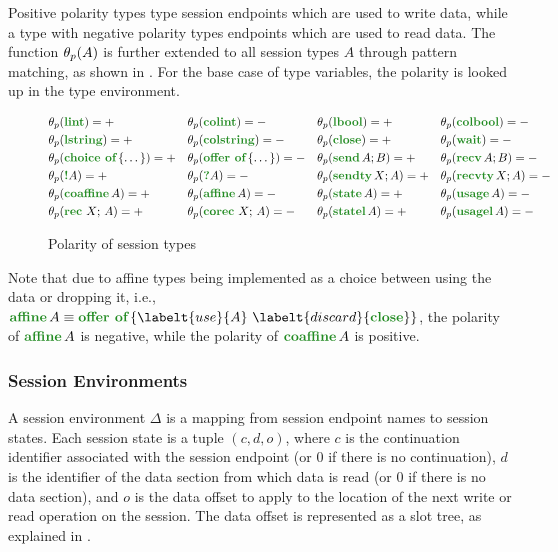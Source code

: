 Positive polarity types type session endpoints which are used to write data, while a type with negative polarity types endpoints which are used to read data. The function $\theta_{p}(A)$ is further extended to all session types $A$ through pattern matching, as shown in . For the base case of type variables, the polarity is looked up in the type environment.

\begin{figure}
    \centering
    \[\begin{aligned}
        &\polarityof{\theta}{\lintt} = + && \polarityof{\theta}{\colintt} = - && \polarityof{\theta}{\lboolt} = + && \polarityof{\theta}{\colboolt} = - \\
        &\polarityof{\theta}{\lstringt} = + && \polarityof{\theta}{\colstringt} = - && \polarityof{\theta}{\closet} = + && \polarityof{\theta}{\waitt} = - \\
        &\polarityof{\theta}{\choicet{\dots}} = + && \polarityof{\theta}{\offert{\dots}} = - && \polarityof{\theta}{\sendt{A}{B}} = + && \polarityof{\theta}{\recvt{A}{B}} = - \\
        &\polarityof{\theta}{\bangt{A}} = + && \polarityof{\theta}{\whynott{A}} = - && \polarityof{\theta}{\sendtyt{X}{A}} = + && \polarityof{\theta}{\recvtyt{X}{A}} = - \\
        &\polarityof{\theta}{\coaffinet{A}} = + && \polarityof{\theta}{\affinet{A}} = - && \polarityof{\theta}{\statet{A}} = + && \polarityof{\theta}{\usaget{A}} = - \\
        &\polarityof{\theta}{\rect{X}{A}} = + && \polarityof{\theta}{\corect{X}{A}} = - && \polarityof{\theta}{\statelt{A}} = + && \polarityof{\theta}{\usagelt{A}} = - \\
    \end{aligned}\]
    \caption{Polarity of session types}
    \label{fig:TypePolarity}
\end{figure}

Note that due to affine types being implemented as a choice between using the data or dropping it, i.e., $\affinet{A} \equiv \offert{\labelt{use}{A}\ \labelt{discard}{\closet}}$, the polarity of $\affinet{A}$ is negative, while the polarity of $\coaffinet{A}$ is positive.

\subsubsection{Session Environments}

A session environment $\Delta$ is a mapping from session endpoint names to session states. Each session state is a tuple $(c, d, o)$, where $c$ is the continuation identifier associated with the session endpoint (or $0$ if there is no continuation), $d$ is the identifier of the data section from which data is read (or $0$ if there is no data section), and $o$ is the data offset to apply to the location of the next write or read operation on the session. The data offset is represented as a slot tree, as explained in .

